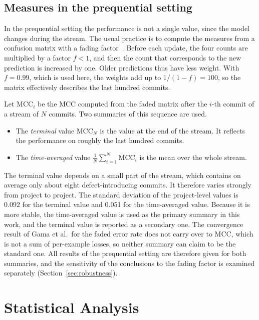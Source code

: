\documentclass[12pt,a4paper,oneside]{report}
\begin{document}
\subsection{Measures in the prequential setting}

In the prequential setting the performance is not a single value, since the
model changes during the stream. The usual practice is to compute the
measures from a confusion matrix with a fading
factor~\cite{gama2013prequential}. Before each update, the four counts are
multiplied by a factor $f < 1$, and then the count that corresponds to the
new prediction is increased by one. Older predictions thus have less weight.
With $f = 0.99$, which is used here, the weights add up to $1/(1-f) = 100$,
so the matrix effectively describes the last hundred commits.

Let $\mathrm{MCC}_i$ be the MCC computed from the faded matrix after the
$i$-th commit of a stream of $N$ commits. Two summaries of this sequence are
used.

\begin{itemize}[leftmargin=*]
\item The \emph{terminal} value $\mathrm{MCC}_N$ is the value at the end of
the stream. It reflects the performance on roughly the last hundred commits.
\item The \emph{time-averaged} value $\frac{1}{N}\sum_{i=1}^{N}\mathrm{MCC}_i$
is the mean over the whole stream.
\end{itemize}

The terminal value depends on a small part of the stream, which contains on
average only about eight defect-introducing commits. It therefore varies
strongly from project to project. The standard deviation of the project-level
values is 0.092 for the terminal value and 0.051 for the time-averaged value.
Because it is more stable, the time-averaged value is used as the primary
summary in this work, and the terminal value is reported as a secondary one.
The convergence result of Gama et al.\ for the faded error rate does not
carry over to MCC, which is not a sum of per-example losses, so neither
summary can claim to be the standard one. All results of the prequential
setting are therefore given for both summaries, and the sensitivity of the
conclusions to the fading factor is examined separately
(Section~\ref{sec:robustness}).

\section{Statistical Analysis}\label{sec:stats}
\end{document}

